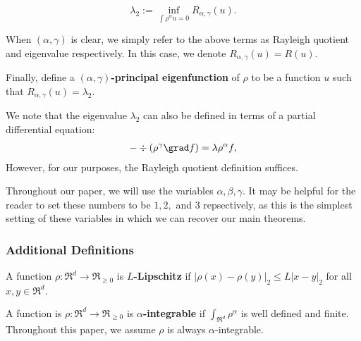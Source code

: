 \[ \lambda_2 := \inf_{\int \rho^\alpha u = 0} R_{\alpha, \gamma}(u). \]

When $(\alpha, \gamma)$ is clear, we simply refer to the above
terms as Rayleigh quotient and eigenvalue respectively. In this
case, we denote $R_{\alpha, \gamma}(u) = R(u)$.

Finally, define a \textbf{$(\alpha, \gamma)$-principal eigenfunction} of
$\rho$ to be a function $u$ such that $R_{\alpha, \gamma}(u) =
\lambda_2$.

We note that the eigenvalue $\lambda_2$ can also be defined in
terms of a partial differential equation: 
\begin{align*}
-\div\left(\rho^\gamma \grad f\right) = \lambda \rho^\alpha f,
\end{align*}
However, for our
purposes, the Rayleigh quotient definition suffices.

Throughout our paper, we will use the variables $\alpha, \beta,
\gamma$. It may be helpful for the reader to set these numbers to be $1, 2,$ and $3$
repsectively, as this is the simplest setting of these variables
in which we can recover our main theorems.

\subsubsection{Additional Definitions}
A function $\rho: \Re^d \to \Re_{\geq 0}$ is
\textbf{$L$-Lipschitz} if $|\rho(x)-\rho(y)|_2 \leq L|x-y|_2$ for
all $x, y \in \Re^d.$

A function is $\rho:\Re^d \to \Re_{\geq 0}$ is
\textbf{$\alpha$-integrable} if $\int_{\Re^d} \rho^\alpha$ is
well defined and finite. Throughout this paper, we assume $\rho$
is always $\alpha$-integrable.
